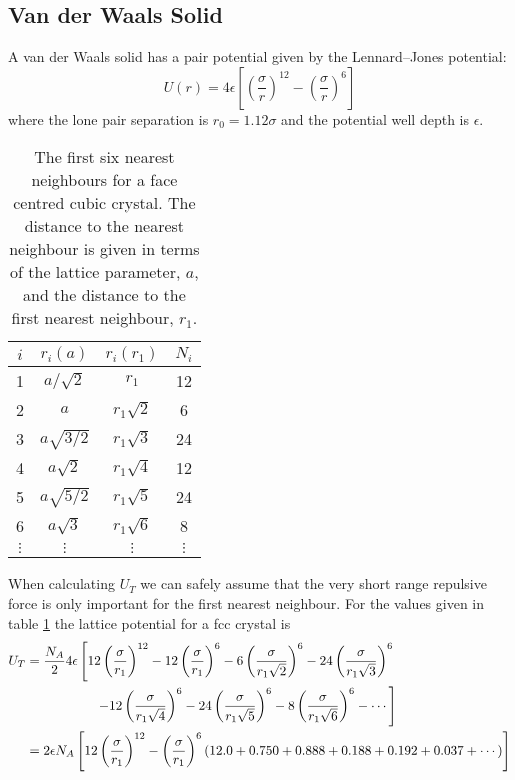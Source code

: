     \subsection{Van der Waals Solid}
    A van der Waals solid has a pair potential given by the Lennard--Jones potential:
    \[U(r) = 4\epsilon\left[\left(\frac{\sigma}{r}\right)^{12} - \left(\frac{\sigma}{r}\right)^6\right]\]
    where the lone pair separation is \(r_0 = 1.12\sigma\) and the potential well depth is \(\epsilon\).
    \begin{table}[ht]
        \centering
        \begin{tabular}{c|ccc}\hline
            \(i\) & \(r_i(a)\) & \(r_i(r_1)\) & \(N_i\)\\\hline
            1 & \(a/\sqrt{2}\) & \(r_1\) & 12\\
            2 & \(a\) & \(r_1\sqrt{2}\) & 6\\
            3 & \(a\sqrt{3/2}\) & \(r_1\sqrt{3}\) & 24\\
            4 & \(a\sqrt{2}\) & \(r_1\sqrt{4}\) & 12\\
            5 & \(a\sqrt{5/2}\) & \(r_1\sqrt{5}\) & 24\\
            6 & \(a\sqrt{3}\) & \(r_1\sqrt{6}\) & 8\\
            \(\vdots\) & \(\vdots\) & \(\vdots\) & \(\vdots\)\\\hline
        \end{tabular}
        \caption{The first six nearest neighbours for a face centred cubic crystal. The distance to the nearest neighbour is given in terms of the lattice parameter, \(a\), and the distance to the first nearest neighbour, \(r_1\).}
        \label{tab:fcc nn}
    \end{table}
    When calculating \(U_T\) we can safely assume that the very short range repulsive force is only important for the first nearest neighbour.
    For the values given in table \ref{tab:fcc nn} the lattice potential for a fcc crystal is
    \begin{align*}
        U_T &= \frac{N_A}{2}4\epsilon\left[12\left(\frac{\sigma}{r_1}\right)^{12} - 12\left(\frac{\sigma}{r_1}\right)^6 - 6\left(\frac{\sigma}{r_1\sqrt{2}}\right)^6 - 24\left(\frac{\sigma}{r_1\sqrt{3}}\right)^6\right. \\ &\hphantom{U_T = \frac{N_A}{2}4\epsilon}\left.-12\left(\frac{\sigma}{r_1\sqrt{4}}\right)^6 - 24\left(\frac{\sigma}{r_1\sqrt{5}}\right)^6 - 8\left(\frac{\sigma}{r_1\sqrt{6}}\right)^6 - \dotsb\right]\\
        &= 2\epsilon N_A\left[12\left(\frac{\sigma}{r_1}\right)^{12} - \left(\frac{\sigma}{r_1}\right)^6(12.0 + 0.750 + 0.888 + 0.188 + 0.192 + 0.037 +\dotsb)\right]
    \end{align*}
